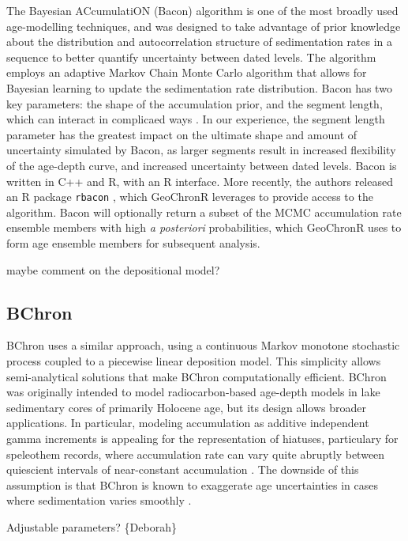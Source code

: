 \documentclass[gchron, manuscript]{copernicus}
\begin{document}
The Bayesian ACcumulatiON (Bacon) algorithm \citep{bacon} is one of the most broadly used age-modelling techniques, and was designed to take advantage of prior knowledge about the distribution and autocorrelation structure of sedimentation rates in a sequence to better quantify uncertainty between dated levels.
The algorithm employs an adaptive Markov Chain Monte Carlo algorithm that allows for Bayesian learning to update the sedimentation rate distribution.
Bacon has two key parameters: the shape of the accumulation prior, and the segment length, which can interact in complicaed ways \citep{trachsel2017}.
In our experience, the segment length parameter has the greatest impact on the ultimate shape and amount of uncertainty simulated by Bacon, as larger segments result in increased flexibility of the age-depth curve, and increased uncertainty between dated levels.
Bacon is written in C++ and R, with an R interface.
More recently, the authors released an R package \texttt{rbacon} \citep{baconPackage}, which GeoChronR leverages to provide access to the algorithm.
Bacon will optionally return a subset of the MCMC accumulation rate ensemble members with high \emph{a posteriori} probabilities, which GeoChronR uses to form age ensemble members for subsequent analysis.

maybe comment on the depositional model?

\subsection{BChron}

BChron \citep[\citet{parnell2008flexible}]{bchron} uses a similar approach, using a continuous Markov monotone stochastic process coupled to a piecewise linear deposition model. This simplicity allows semi-analytical solutions that make BChron computationally efficient. BChron was originally intended to model radiocarbon-based age-depth models in lake sedimentary cores of primarily Holocene age, but its design allows broader applications. In particular, modeling accumulation as additive independent gamma increments is appealing for the representation of hiatuses, particulary for speleothem records, where accumulation rate can vary quite abruptly between quiescient intervals of near-constant accumulation \citep[\citet{PRYSM},\citet{Hu_epsl17}]{Parnell_QSR2011}. The downside of this assumption is that BChron is known to exaggerate age uncertainties in cases where sedimentation varies smoothly \citep{trachsel2017}.

Adjustable parameters? \{Deborah\}
\end{document}
